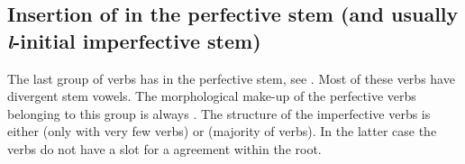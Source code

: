 
\subsection{Insertion of  in the perfective stem (and usually \textit{l}-initial imperfective stem)}
\label{ssec:Insertion of l in the perfective stem}

The last group of verbs has  in the perfective stem, see . Most of these verbs have divergent stem vowels. The morphological make-up of the perfective verbs belonging to this group is always . The structure of the imperfective verbs is either  (only with very few verbs) or  (majority of verbs). In the latter case the verbs do not have a slot for a  agreement within the root.

